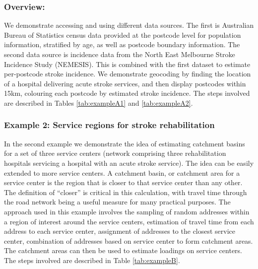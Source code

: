 \documentclass[utf8]{frontiersHLTH}
\begin{document}
\subsubsection{Overview:}\label{overview} 
We demonstrate accessing and using different data sources. The first
is Australian Bureau of Statistics census data provided at the
postcode level for population information, stratified by age, as well
as postcode boundary information. The second data source is incidence
data from the North East Melbourne Stroke Incidence Study
(NEMESIS)\cite{thrift_stroke_2000}. This is combined with the first
dataset to estimate per-postcode stroke incidence. We demonstrate
geocoding by finding the location of a hospital delivering acute
stroke services, and then display postcodes within 15km, colouring
each postcode by estimated stroke incidence. The steps involved are
described in Tables \ref{tab:exampleA1} and \ref{tab:exampleA2}.

\subsubsection{Example 2: Service regions for stroke rehabilitation}\label{example-2-service-regions-for-stroke-rehabilitation} 
In the second example we demonstrate the idea of estimating catchment
basins for a set of three service centers (network comprising three
rehabilitation hospitals servicing a hospital with an acute stroke
service). The idea can be easily extended to more service centers. A
catchment basin, or catchment area for a service center is the region
that is closer to that service center than any other. The definition
of ``closer'' is critical in this calculation, with travel time
through the road network being a useful measure for many practical
purposes. The approach used in this example involves the sampling of
random addresses within a region of interest around the service
centers, estimation of travel time from each address to each service
center, assignment of addresses to the closest service center,
combination of addresses based on service center to form catchment
areas. The catchment areas can then be used to estimate loadings on
service centers. The steps involved are described in Table
\ref{tab:exampleB}.
\end{document}
